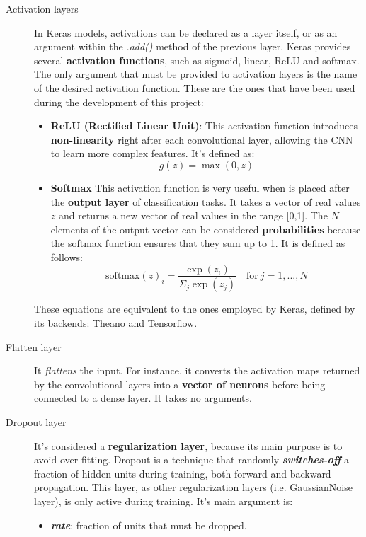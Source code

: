 \begin{description}
	\item[Activation layers] In Keras models, activations can be declared as a layer itself, or as an argument within the \textit{.add()} method of the previous layer. Keras provides several \textbf{activation functions}, such as sigmoid, linear, ReLU and softmax. The only argument that must be provided to activation layers is the name of the desired activation function. These are the ones that have been used during the development of this project:
	\begin{itemize}
		\item \textbf{ReLU (Rectified Linear Unit)}: This activation function introduces \textbf{non-linearity} right after each convolutional layer, allowing the CNN to learn more complex features. It's defined as:
		\begin{equation}\label{eq:ReLU}
		g(z)=\max(0,z)
		\end{equation}
		
		\item \textbf{Softmax} This activation function is very useful when is placed after the \textbf{output layer} of classification tasks. It takes a vector of real values $z$ and returns a new vector of real values in the range [0,1]. The $N$ elements of the output vector can be considered \textbf{probabilities} because the softmax function ensures that they sum up to 1. It is defined as follows:
		\begin{equation}\label{eq:SoftMax}
		\mathrm{softmax}(z)_i=\frac{\exp(z_i)}{\Sigma_{j}{\exp(z_j)}} \quad \mathrm{for} \ j=1, ...,N
		\end{equation}
	\end{itemize}
	These equations \cite{Goodfellow-et-al-2016} are equivalent to the ones employed by Keras, defined by its backends: Theano and Tensorflow.
\end{description}

\begin{description}
	\item[Flatten layer] It \textit{flattens} the input. For instance, it converts the activation maps returned by the convolutional layers into a \textbf{vector of neurons} before being connected to a dense layer. It takes no arguments.
\end{description}

\begin{description}
	\item[Dropout layer] It's considered a \textbf{regularization layer}, because its main purpose is to avoid over-fitting. Dropout \cite{Srivastava-et-al-2014} is a technique that randomly \textbf{\textit{switches-off}} a fraction of hidden units during training, both forward and backward propagation. This layer, as other regularization layers (i.e. GaussianNoise layer), is only active during training. It's main argument is:
	\begin{itemize}
		\item \textbf{\textit{rate}}: fraction of units that must be dropped.
	\end{itemize}
\end{description}

